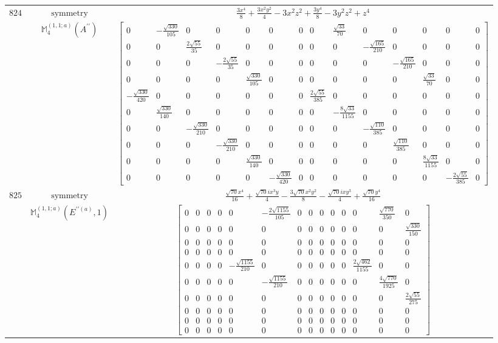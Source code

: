 \documentclass[fleqn,8pt,landscape]{jsarticle}
\begin{document}
\begin{longtable}{ccc}
$ 824 $ & $ \text{symmetry} $ & $ \frac{3 x^{4}}{8} + \frac{3 x^{2} y^{2}}{4} - 3 x^{2} z^{2} + \frac{3 y^{4}}{8} - 3 y^{2} z^{2} + z^{4} $ \\
$  $ & $ \mathbb{M}_{4}^{(1,1;a)}(A^{\prime\prime}) $ & $ \begin{bmatrix} 0 & - \frac{\sqrt{330}}{105} & 0 & 0 & 0 & 0 & 0 & 0 & \frac{\sqrt{33}}{70} & 0 & 0 & 0 & 0 & 0 \\ 0 & 0 & \frac{2 \sqrt{55}}{35} & 0 & 0 & 0 & 0 & 0 & 0 & - \frac{\sqrt{165}}{210} & 0 & 0 & 0 & 0 \\ 0 & 0 & 0 & - \frac{2 \sqrt{55}}{35} & 0 & 0 & 0 & 0 & 0 & 0 & - \frac{\sqrt{165}}{210} & 0 & 0 & 0 \\ 0 & 0 & 0 & 0 & \frac{\sqrt{330}}{105} & 0 & 0 & 0 & 0 & 0 & 0 & \frac{\sqrt{33}}{70} & 0 & 0 \\ - \frac{\sqrt{330}}{420} & 0 & 0 & 0 & 0 & 0 & 0 & \frac{2 \sqrt{55}}{385} & 0 & 0 & 0 & 0 & 0 & 0 \\ 0 & \frac{\sqrt{330}}{140} & 0 & 0 & 0 & 0 & 0 & 0 & - \frac{8 \sqrt{33}}{1155} & 0 & 0 & 0 & 0 & 0 \\ 0 & 0 & - \frac{\sqrt{330}}{210} & 0 & 0 & 0 & 0 & 0 & 0 & - \frac{\sqrt{110}}{385} & 0 & 0 & 0 & 0 \\ 0 & 0 & 0 & - \frac{\sqrt{330}}{210} & 0 & 0 & 0 & 0 & 0 & 0 & \frac{\sqrt{110}}{385} & 0 & 0 & 0 \\ 0 & 0 & 0 & 0 & \frac{\sqrt{330}}{140} & 0 & 0 & 0 & 0 & 0 & 0 & \frac{8 \sqrt{33}}{1155} & 0 & 0 \\ 0 & 0 & 0 & 0 & 0 & - \frac{\sqrt{330}}{420} & 0 & 0 & 0 & 0 & 0 & 0 & - \frac{2 \sqrt{55}}{385} & 0 \end{bmatrix} $ \\ \hline
$ 825 $ & $ \text{symmetry} $ & $ \frac{\sqrt{70} x^{4}}{16} + \frac{\sqrt{70} i x^{3} y}{4} - \frac{3 \sqrt{70} x^{2} y^{2}}{8} - \frac{\sqrt{70} i x y^{3}}{4} + \frac{\sqrt{70} y^{4}}{16} $ \\
$  $ & $ \mathbb{M}_{4}^{(1,1;a)}(E^{\prime\prime(a)},1) $ & $ \begin{bmatrix} 0 & 0 & 0 & 0 & 0 & - \frac{2 \sqrt{1155}}{105} & 0 & 0 & 0 & 0 & 0 & 0 & \frac{\sqrt{770}}{350} & 0 \\ 0 & 0 & 0 & 0 & 0 & 0 & 0 & 0 & 0 & 0 & 0 & 0 & 0 & \frac{\sqrt{330}}{150} \\ 0 & 0 & 0 & 0 & 0 & 0 & 0 & 0 & 0 & 0 & 0 & 0 & 0 & 0 \\ 0 & 0 & 0 & 0 & 0 & 0 & 0 & 0 & 0 & 0 & 0 & 0 & 0 & 0 \\ 0 & 0 & 0 & 0 & - \frac{\sqrt{1155}}{210} & 0 & 0 & 0 & 0 & 0 & 0 & \frac{2 \sqrt{462}}{1155} & 0 & 0 \\ 0 & 0 & 0 & 0 & 0 & - \frac{\sqrt{1155}}{210} & 0 & 0 & 0 & 0 & 0 & 0 & \frac{4 \sqrt{770}}{1925} & 0 \\ 0 & 0 & 0 & 0 & 0 & 0 & 0 & 0 & 0 & 0 & 0 & 0 & 0 & \frac{2 \sqrt{55}}{275} \\ 0 & 0 & 0 & 0 & 0 & 0 & 0 & 0 & 0 & 0 & 0 & 0 & 0 & 0 \\ 0 & 0 & 0 & 0 & 0 & 0 & 0 & 0 & 0 & 0 & 0 & 0 & 0 & 0 \\ 0 & 0 & 0 & 0 & 0 & 0 & 0 & 0 & 0 & 0 & 0 & 0 & 0 & 0 \end{bmatrix} $ \\ \hline

\end{longtable}
\end{document}
